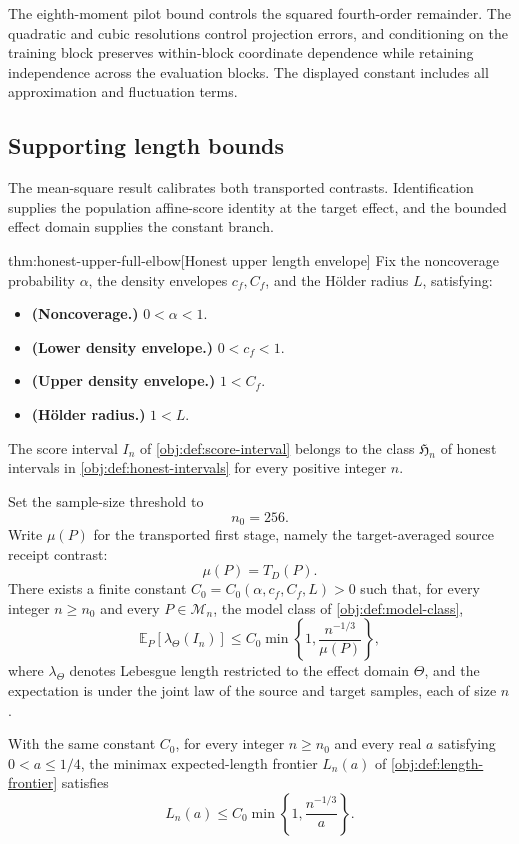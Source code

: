 The eighth-moment pilot bound controls the squared fourth-order remainder. The quadratic and cubic resolutions control projection errors, and conditioning on the training block preserves within-block coordinate dependence while retaining independence across the evaluation blocks. The displayed constant includes all approximation and fluctuation terms.

\subsection{Supporting length bounds}

The mean-square result calibrates both transported contrasts. Identification supplies the population affine-score identity at the target effect, and the bounded effect domain supplies the constant branch.

\begin{theoremv}{thm:honest-upper-full-elbow}[Honest upper length envelope]
Fix the noncoverage probability \(\alpha\), the density envelopes \(c_f,C_f\), and the Hölder radius \(L\), satisfying:
\begin{itemize}
\item \textbf{(Noncoverage.)} \(0<\alpha<1\).
\item \textbf{(Lower density envelope.)} \(0<c_f<1\).
\item \textbf{(Upper density envelope.)} \(1<C_f\).
\item \textbf{(Hölder radius.)} \(1<L\).
\end{itemize}
The score interval \(I_n\) of \cref{obj:def:score-interval} belongs to the class \(\mathfrak H_n\) of honest intervals in \cref{obj:def:honest-intervals} for every positive integer \(n\).

Set the sample-size threshold to
\[
n_0=256.
\]
Write \(\mu(P)\) for the transported first stage, namely the target-averaged source receipt contrast:
\[
\mu(P)=T_D(P).
\]
There exists a finite constant \(C_0=C_0(\alpha,c_f,C_f,L)>0\) such that, for every integer \(n\ge n_0\) and every \(P\in\mathcal M_n\), the model class of \cref{obj:def:model-class},
\[
\mathbb E_P\!\left[\lambda_{\Theta}(I_n)\right]
\le C_0\min\left\{1,\frac{n^{-1/3}}{\mu(P)}\right\},
\]
where \(\lambda_{\Theta}\) denotes Lebesgue length restricted to the effect domain \(\Theta\), and the expectation is under the joint law of the source and target samples, each of size \(n\).

With the same constant \(C_0\), for every integer \(n\ge n_0\) and every real \(a\) satisfying \(0<a\le 1/4\), the minimax expected-length frontier \(L_n(a)\) of \cref{obj:def:length-frontier} satisfies
\[
L_n(a)\le C_0\min\left\{1,\frac{n^{-1/3}}{a}\right\}.
\]
\end{theoremv}

